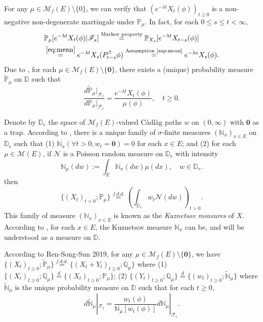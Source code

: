 \documentclass[12pt,a4paper]{amsart}
\numberwithin{equation}{section}
\theoremstyle{plain}
\theoremstyle{definition}
\theoremstyle{remark}
\begin{document}
For any $\mu \in \mathcal M_f(E)\setminus\{0\}$, we can verify that $(e^{- \lambda t} X_t(\phi))_{t\geq 0}$ is a non-negative non-degenerate martingale under $\mathbb P_\mu$.
In fact, for each $0\leq s\leq t< \infty$,
\begin{align}
&\mathbb P_\mu[e^{-\lambda t}X_t(\phi)|\mathscr F_s] 
\overset{\text{Markov property}} = \mathbb P_{X_s}[e^{-\lambda t} X_{t-s}(\phi)]
\\&\overset{\eqref{eq:mean}}= e^{-\lambda t}X_s(P_{t-s}^\beta \phi)
\overset{\text{Assumption \ref{asp:mean}}}=e^{-\lambda s}X_s(\phi).
\end{align}
Due to \cite[Lemma 18.18]{Kallenberg2002Foundations}, for each $\mu \in \mathcal M_f(E)\setminus\{\mathbf 0\}$, there exists a (unique) probability measure $\widetilde {\mathbb P}_\mu$  on $\mathbb D$ such that
\begin{equation} \label{eq:mt}
\frac{d\widetilde{\mathbb P}_\mu|_{\mathscr F_t}}{d\mathbb P_\mu|_{\mathscr F_t}}
=\frac{e^{-\lambda t}X_t(\phi)}{\mu(\phi) },
\quad t\geq 0.
\end{equation}

Denote by $\mathbb D_e$ the space of $\mathcal M_f(E)$-valued C\`adl\`ag paths $w$ on $(0,\infty)$ with $\mathbf 0$ as a trap.
According to \cite[Section 8.4]{Li2011Measure-valued}, there is a unique family of $\sigma$-finite measures $(\mathbb N_x)_{x\in E}$ on $\mathbb D_e$ such that (1) $\mathbb N_x (\forall t > 0, w_t =\mathbf 0) =0$ for each $x\in E$; and (2) for each $\mu \in \mathcal M(E)$, if $\mathcal N$ is a Poisson random measure on $\mathbb D_e$ with intensity
\[
\mathbb N_\mu(dw):= \int_E \mathbb N_x(dw)\mu(dx), \quad w\in \mathbb D_e.
\]
then
\[
\{(X_t)_{t> 0};\mathbb P_\mu\}
\overset{f.d.d.}{=} \left(\int_{\mathbb D_e} w_t\mathcal N(dw)\right)_{t> 0}.
\]
This family of measure $(\mathbb N_x)_{x\in E}$ is known as the \emph{Kuznetsov measures} of $X$.
According to \cite[Theorem 8.22]{Li2011Measure-valued}, for each $x\in E$, the Kuznetsov measure $\mathbb N_x$ can be, and will be understood as a measure on $\mathbb D$.


According to Ren-Song-Sun 2019, for any $\mu \in \mathcal M_f(E)\setminus \{\mathbf 0\}$, we have $\{(X_t)_{t\geq 0}; \widetilde {\mathbb P}_\mu\} \overset{f.d.d.} = \{ (X_t+ Y_t)_{t\geq 0}; \mathbb Q_\mu\} $ where (1) $\{(X_t)_{t\geq 0}; \mathbb Q_\mu\} \overset{d} =  \{(X_t)_{t\geq 0}; \mathbb P_\mu\}$; (2) $\{(Y_t)_{t\geq 0}; \mathbb Q_\mu \} \overset{d} = \{(w_t)_{t\geq 0}; \widetilde{ \mathbb N}_\mu\}$ where $\widetilde {\mathbb N}_\mu$ is the unique probability measure on $\mathbb D$ such that for each $t\geq 0$, 
\[d \widetilde {\mathbb N}_\mu|_{\mathscr F_t} = \frac{w_t(\phi)}{\mathbb N_\mu[w_t(\phi)]} d\mathbb N_\mu|_{\mathscr F_t}.\]
\end{document}
